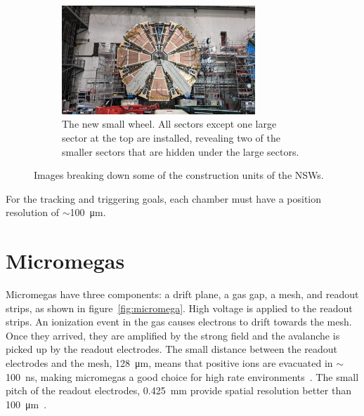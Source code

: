 \begin{figure}
\medskip

\begin{subfigure}{\textwidth}
  \centering
  \includegraphics[width=0.8\textwidth]{figures/nsw_2021-05-27_landscape.jpeg}
  \caption{The new small wheel. All sectors except one large sector at the top are installed, revealing two of the smaller sectors that are hidden under the large sectors.}
  \label{fig:nsw}
  \end{subfigure}
\caption{Images breaking down some of the construction units of the NSWs.}
\label{fig:nsw_breakdown}
\end{figure}

For the tracking and triggering goals, each chamber must have a position resolution of $\sim$\SI{100}{\micro\meter}. 


\section{Micromegas}

Micromegas have three components: a drift plane, a gas gap, a mesh, and readout strips, as shown in figure~\ref{fig:micromega}. High voltage is applied to the readout strips. An ionization event in the gas causes electrons to drift towards the mesh. Once they arrived, they are amplified by the strong field and the avalanche is picked up by the readout electrodes. The small distance between the readout electrodes and the mesh, \SI{128}{\micro\meter}, means that positive ions are evacuated in $\sim$\SI{100}{\nano\second}, making micromegas a good choice for high rate environments~\cite{nsw_tdr}. The small pitch of the readout electrodes, \SI{0.425}{mm} provide spatial resolution better than \SI{100}{\micro\meter}~\cite{stelzer_new_2016}.

